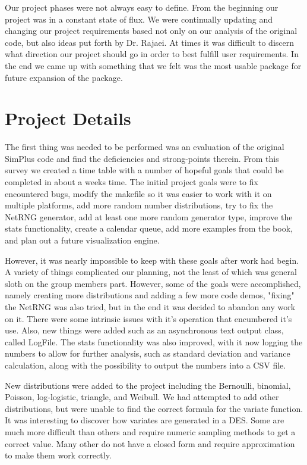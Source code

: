 \documentclass[12pt]{report}
\newcommand{\mychapter}[1]{\chapter{#1} \label{ch:#1} \thispagestyle{fancy}}
\begin{document}
	Our project phases were not always easy to define.  From the beginning our project was in a constant state of flux.  We were continually updating and changing our project requirements based not only on our analysis of the original code, but also ideas put forth by Dr. Rajaei.  At times it was difficult to discern what direction our project should go in order to best fulfill user requirements. In the end we came up with something that we felt was the most usable package for future expansion of the package.

\mychapter{Project Details}
	The first thing was needed to be performed was an evaluation of the original SimPlus code and find the deficiencies and strong-points therein.  From this survey we created a time table with a number of hopeful goals that could be completed in about a weeks time.  The initial project goals were to fix encountered bugs, modify the makefile so it was easier to work with it on multiple platforms, add more random number distributions, try to fix the NetRNG generator, add at least one more random generator type, improve the stats functionality, create a calendar queue, add more examples from the book, and plan out a future visualization engine.

	However, it was nearly impossible to keep with these goals after work had begin.  A variety of things complicated our planning, not the least of which was general sloth on the group members part.  However, some of the goals were accomplished, namely creating more distributions and adding a few more code demos, "fixing" the NetRNG was also tried, but in the end it was decided to abandon any work on it.  There were some intrinsic issues with it's operation that encumbered it's use.  Also, new things were added such as an asynchronous text output class, called LogFile.  The stats functionality was also improved, with it now logging the numbers to allow for further analysis, such as standard deviation and variance calculation, along with the possibility to output the numbers into a CSV file.

	New distributions were added to the project including the Bernoulli, binomial, Poisson, log-logistic, triangle, and Weibull.  We had attempted to add other distributions, but were unable to find the correct formula for the variate function.  It was interesting to discover how variates are generated in a DES.  Some are much more difficult than others and require numeric sampling methods to get a correct value. Many other do not have a closed form and require approximation to make them work correctly.
\end{document}
